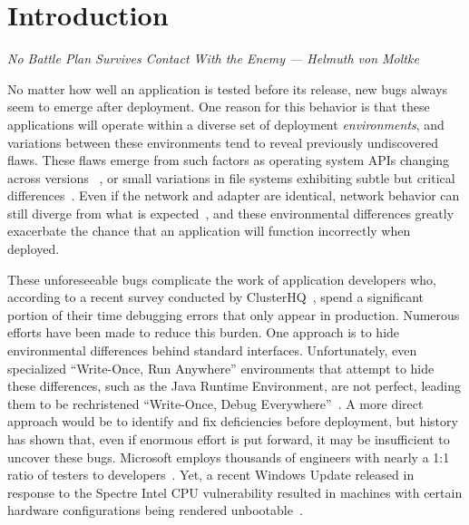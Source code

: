 \section{Introduction}
\label{SEC:introduction}
\textit{No Battle Plan Survives Contact With the Enemy --- Helmuth von Moltke}

No matter how well an application is tested before its release,
new bugs always seem to emerge after deployment.
One reason for this behavior
is that these applications will operate within a diverse set of
deployment \emph{environments},
and variations between these environments tend to
reveal previously undiscovered flaws.
These flaws emerge from
such factors as
operating system APIs changing across versions
~\cite{LinuxGlibcChanges},
or small variations in file systems exhibiting subtle but critical
differences~\cite{EXT4Layout, AppleHFS}.
Even if the network and adapter are identical,
network behavior can still diverge from what is expected~\cite{vbox},
and these environmental differences greatly exacerbate
the chance that an application will function incorrectly when deployed.

These unforeseeable bugs
complicate the work of application developers who, according to a
recent survey conducted by ClusterHQ~\cite{ClusterHQSurvey},
spend a significant portion of their time
debugging errors that only appear in production.
Numerous efforts have been made to reduce this burden.
One approach
is to hide environmental differences behind standard interfaces.
Unfortunately,
even specialized ``Write-Once, Run Anywhere'' environments
that attempt to hide these differences,
such as the Java Runtime Environment,
are not perfect,
leading them to be rechristened ``Write-Once, Debug Everywhere''~\cite{WODE}.
A more direct approach would be
to identify and fix deficiencies before deployment,
but history has shown that,
even if enormous effort is put forward,
it may be insufficient to uncover these bugs.
Microsoft employs thousands of engineers with nearly a
1:1 ratio of testers to developers~\cite{Page2009}.
Yet, a recent Windows Update released
in response to the Spectre Intel CPU vulnerability
resulted in machines with certain hardware configurations
being rendered unbootable~\cite{kb4056892}.


